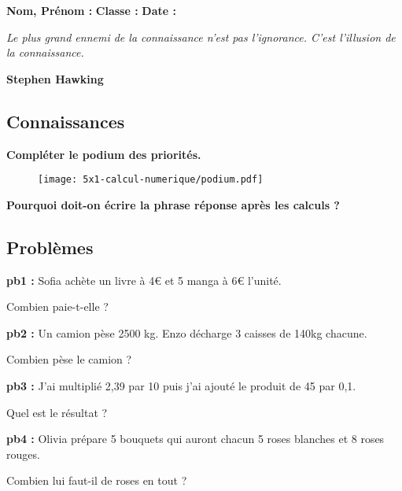



\textbf{Nom, Prénom :} \hspace{8cm} \textbf{Classe :} \hspace{3cm} \textbf{Date :}\\

\begin{center}
  \textit{Le plus grand ennemi de la connaissance n'est pas l'ignorance. C'est l'illusion de la connaissance.} 
  
  \textbf{Stephen Hawking}
\end{center}

\subsection*{Connaissances} 

\textbf{Compléter le podium des priorités.} 
\begin{figure}[H]
  \centering
  \texttt{[image: 5x1-calcul-numerique/podium.pdf]}
\end{figure} 

\textbf{Pourquoi doit-on écrire la phrase réponse après les calculs ?} \\ \Pointilles[2]


\subsection*{Problèmes}

\textbf{pb1 : }
Sofia achète un livre à 4€ et 5 manga à 6€ l'unité. 

Combien paie-t-elle ?  \\ \Pointilles[5]

\textbf{pb2 : }
Un camion pèse 2500 kg. Enzo décharge 3 caisses de 140kg chacune. 

Combien pèse le camion ? \\ \Pointilles[5] 

\textbf{pb3 : }
\og J'ai multiplié 2,39 par 10 puis j'ai ajouté le produit de 45 par 0,1.\fg 

Quel est le résultat ? \\ \Pointilles[5]

\textbf{pb4 : }
Olivia prépare 5 bouquets qui auront chacun 5 roses blanches et 8 roses rouges.

Combien lui faut-il de roses en tout ? \\ \Pointilles[5]

